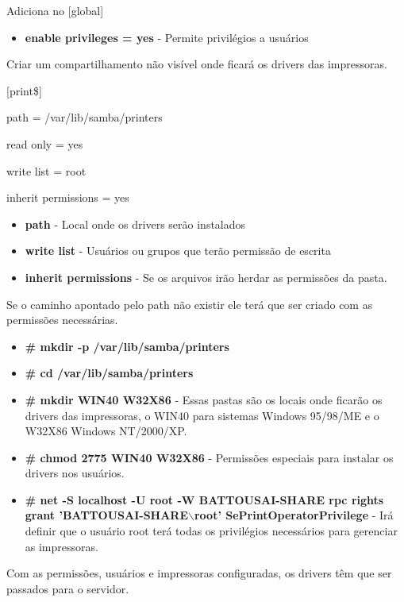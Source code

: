Adiciona no [global]

\begin{itemize}
	\item \textbf{enable privileges = yes} - Permite privilégios a usuários
\end{itemize}

Criar um compartilhamento não visível onde ficará os drivers das impressoras.

[print\$]

path = /var/lib/samba/printers

read only = yes

write list = root

inherit permissions = yes

\begin{itemize}
	\item \textbf{path} - Local onde os drivers serão instalados
	\item \textbf{write list} - Usuários ou grupos que terão permissão de escrita
	\item \textbf{inherit permissions} - Se os arquivos irão herdar as permissões da pasta.
\end{itemize}

Se o caminho apontado pelo path não existir ele terá que ser criado com as permissões necessárias.

\begin{itemize}
	\item \textbf{\# mkdir -p /var/lib/samba/printers}
	
	\item \textbf{\# cd /var/lib/samba/printers}
	\item \textbf{\# mkdir WIN40 W32X86} - Essas pastas são os locais onde ficarão os drivers das impressoras, o WIN40 para sistemas Windows 95/98/ME e o W32X86 Windows NT/2000/XP.
	\item \textbf{\# chmod 2775 WIN40 W32X86} - Permissões especiais para instalar os drivers nos usuários.
	\item \textbf{\# net -S localhost -U root -W BATTOUSAI-SHARE rpc rights grant 'BATTOUSAI-SHARE$\backslash$root' SePrintOperatorPrivilege} - Irá definir que o usuário root terá todas os privilégios necessários para gerenciar as impressoras.
\end{itemize}

Com as permissões, usuários e impressoras configuradas, os drivers têm que ser passados para o servidor.

